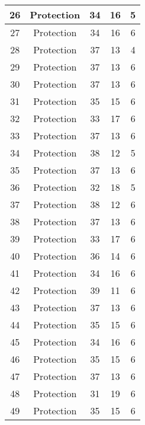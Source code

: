 \documentclass[results.tex]{subfiles}
\begin{document}
\begin{center}
\begin{tabular}{| c || c | c | c | c |}
    \hline
    26 & Protection & 34 & 16 & 5 \\ 
    \hline
    27 & Protection & 34 & 16 & 6 \\ 
    \hline
    28 & Protection & 37 & 13 & 4 \\ 
    \hline
    29 & Protection & 37 & 13 & 6 \\ 
    \hline
    30 & Protection & 37 & 13 & 6 \\ 
    \hline
    31 & Protection & 35 & 15 & 6 \\ 
    \hline
    32 & Protection & 33 & 17 & 6 \\ 
    \hline
    33 & Protection & 37 & 13 & 6 \\ 
    \hline
    34 & Protection & 38 & 12 & 5 \\ 
    \hline
    35 & Protection & 37 & 13 & 6 \\ 
    \hline
    36 & Protection & 32 & 18 & 5 \\ 
    \hline
    37 & Protection & 38 & 12 & 6 \\ 
    \hline
    38 & Protection & 37 & 13 & 6 \\ 
    \hline
    39 & Protection & 33 & 17 & 6 \\ 
    \hline
    40 & Protection & 36 & 14 & 6 \\ 
    \hline
    41 & Protection & 34 & 16 & 6 \\ 
    \hline
    42 & Protection & 39 & 11 & 6 \\ 
    \hline
    43 & Protection & 37 & 13 & 6 \\ 
    \hline
    44 & Protection & 35 & 15 & 6 \\ 
    \hline
    45 & Protection & 34 & 16 & 6 \\ 
    \hline
    46 & Protection & 35 & 15 & 6 \\ 
    \hline
    47 & Protection & 37 & 13 & 6 \\ 
    \hline
    48 & Protection & 31 & 19 & 6 \\ 
    \hline
    49 & Protection & 35 & 15 & 6 \\ 
    \hline   \end{tabular}
\end{center}
\end{document}
